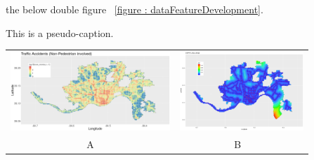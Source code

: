 \documentclass{llncs}
\begin{document}
the below double figure ~\ref{figure : dataFeatureDevelopment}.

\begin{center}
This is a pseudo-caption.\newline
\label{fig : dataFeatureDevelopment}
  \begin{tabular}{ *{2}{c} }
    \includegraphics[height=3cm]{trafficAccidents} &
    \includegraphics[height=3cm]{busStopDistance} \\
    \small A & \small B \
  \end{tabular}
\end{center}
\end{document}
